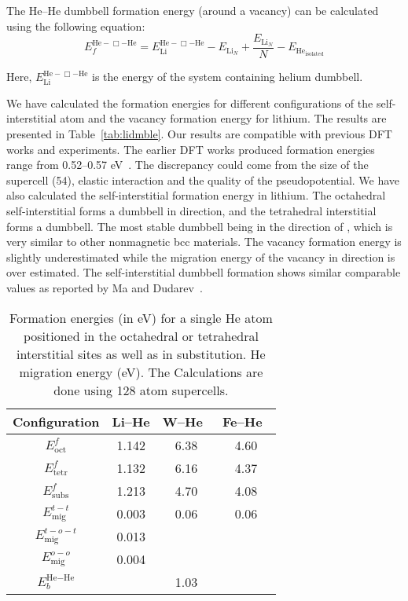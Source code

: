 The He--He dumbbell formation energy (around a vacancy) can be calculated using the following equation:
\begin{equation}\label{eq_hedmbl}
E_f^{\text{He}-\Box-\text{He}} = E_{\text{Li}}^{\text{He}-\Box-\text{He}} - E_{\text{Li}_N} + \frac{E_{\text{Li}_N}}{N} - E_{\text{He}_{\text{isolated}}}
\end{equation}


Here, $E_{\text{Li}}^{\text{He}-\Box-\text{He}}$ is the energy of the system containing helium dumbbell.

We have calculated the formation energies for different configurations of the self-interstitial atom and the vacancy formation energy for lithium. The results are presented in Table~\ref{tab:lidmble}. Our results are compatible with previous DFT works and experiments. The earlier DFT works produced formation energies range from 0.52--0.57 eV~\cite{benedek1992formation, Pawellek_1991, frank1993properties, frank1996first}. The discrepancy could come from the size of the supercell (54), elastic interaction and the quality of the pseudopotential. We have also calculated the self-interstitial formation energy in lithium. The octahedral self-interstitial forms a dumbbell in  direction, and the tetrahedral interstitial forms a  dumbbell. The most stable dumbbell being in the direction of , which is very similar to other nonmagnetic bcc materials. The vacancy formation energy is slightly underestimated while the migration energy of the vacancy in  direction is  over estimated. The self-interstitial dumbbell formation shows similar comparable values as reported by Ma and Dudarev~\cite{ma2019}.


\begin{table}
\caption[Formation energy of helium in lithium]{Formation energies (in eV) for a single He atom positioned in the octahedral or tetrahedral interstitial sites as well as in substitution. He migration energy (eV). The Calculations are done using 128 atom supercells.}
\label{tab:he_li} 
\centering
\begin{tabular}{c c c c} \toprule
Configuration   & Li--He  &  W--He~\cite{becquart2007ab}   &  Fe--He~\cite{seletskaia2005magnetic} \\ \midrule
    $E^{f}_{\text{oct}}$  & 1.142   &  6.38    & 4.60   \\ \hline
    $E^{f}_{\text{tetr}}$ & 1.132   &  6.16    & 4.37   \\ \hline
    $E^f_{\text{subs}}$          & 1.213   &  4.70    & 4.08   \\ \hline
    $E^{t-t}_{\text{mig}}$       & 0.003   &  0.06    & 0.06    \\ \hline 
	$E^{t-o-t}_{\text{mig}}$     & 0.013   &		   &		\\ \hline
	$E^{o-o}_{\text{mig}}$		  & 0.004   &			&		\\ \hline
    $E^{\text{He}-\text{He}}_b$   & 	    &  1.03		 &		\\ 
	\bottomrule
\end{tabular}
\end{table}

